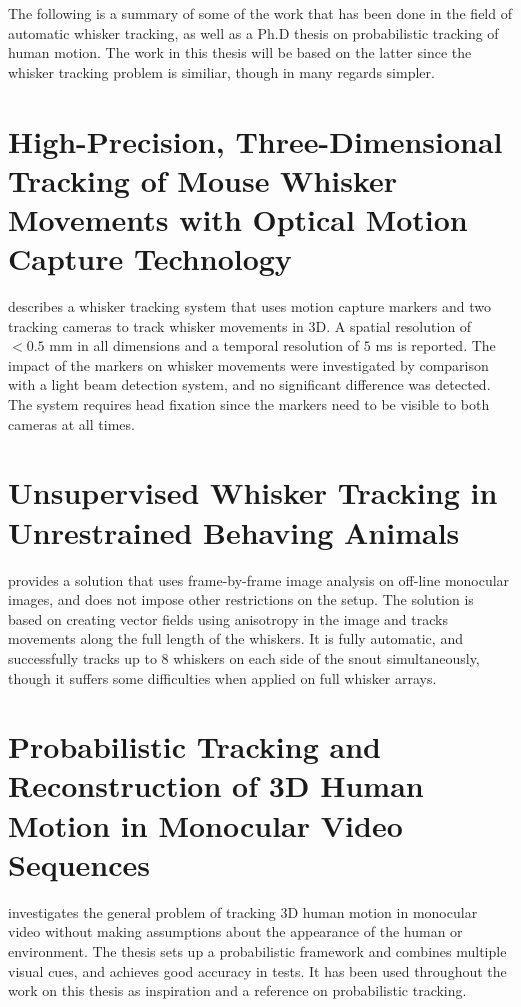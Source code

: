 The following is a summary of some of the work that has been done in
the field of automatic whisker tracking, as well as a Ph.D thesis on
probabilistic tracking of human motion. The work in this thesis will
be based on the latter since the whisker tracking problem is similiar,
though in many regards simpler.

\section{High-Precision, Three-Dimensional Tracking of Mouse Whisker
  Movements with Optical Motion Capture Technology}

\cite{BadExample1} describes a whisker tracking system that uses
motion capture markers and two tracking cameras to track whisker
movements in 3D. A spatial resolution of $<0.5$ mm in all dimensions
and a temporal resolution of $5$ ms is reported. The impact of the
markers on whisker movements were investigated by comparison with a
light beam detection system, and no significant difference was
detected. The system requires head fixation since the markers need to
be visible to both cameras at all times.
        

\section{Unsupervised Whisker Tracking in Unrestrained Behaving
  Animals}

\cite{UnsupervisedTracking} provides a solution that uses
frame-by-frame image analysis on off-line monocular images, and does
not impose other restrictions on the setup. The solution is based on
creating vector fields using anisotropy in the image and tracks
movements along the full length of the whiskers. It is fully
automatic, and successfully tracks up to 8 whiskers on each side of
the snout simultaneously, though it suffers some difficulties when
applied on full whisker arrays.


\section{Probabilistic Tracking and Reconstruction of 3D Human Motion
  in Monocular Video Sequences}
\cite{Hedvig} investigates the general problem of tracking 3D human
motion in monocular video without making assumptions about the
appearance of the human or environment. The thesis sets up a
probabilistic framework and combines multiple visual cues, and
achieves good accuracy in tests. It has been used throughout the work
on this thesis as inspiration and a reference on probabilistic
tracking.
